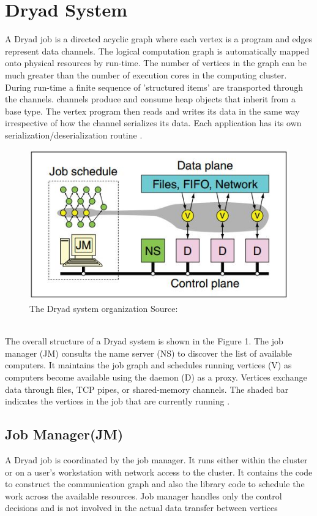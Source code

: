 \documentclass[9pt,twocolumn,twoside]{../../styles/osajnl}
\begin{document}
\section{Dryad System}
A Dryad job is a directed acyclic graph where each vertex is a program and edges represent data channels. The logical computation graph is automatically mapped onto physical resources by run-time. The number of vertices in the graph can be much greater than the number of execution cores in the computing cluster. During run-time a finite sequence of 'structured items' are transported through the channels. channels produce and consume heap objects that inherit from a base type. The vertex program then reads and writes its data in the same way irrespective of how the channel serializes its data. Each application has its own serialization/deserialization routine \cite{DryadMSR2}.
\begin{figure}[htbp]
\begin{center}
\centering
\includegraphics[width=\linewidth]{images/img1}
\caption{The Dryad system organization Source:\cite{DryadMSR2}}
\label{fig:false-color}
\end{center}
\end{figure}\\
The overall structure of a Dryad system is shown in the Figure 1. The job manager (JM) consults the name server (NS) to discover the list of available computers. It maintains the job graph and schedules running vertices (V) as computers become available using the daemon (D) as a proxy. Vertices exchange data through files, TCP pipes, or shared-memory channels. The shaded bar indicates the vertices in the job that are currently running \cite{DryadMSR2}. 
\subsection{Job Manager(JM)}
A Dryad job is coordinated by the job manager. It runs either within the cluster or on a user’s workstation with network access to the cluster. It contains the code to construct the communication graph and also the library code to schedule the work across the available resources. Job manager handles only the control decisions and is not involved in the actual data transfer between vertices \cite{DryadMSR2}
\end{document}

